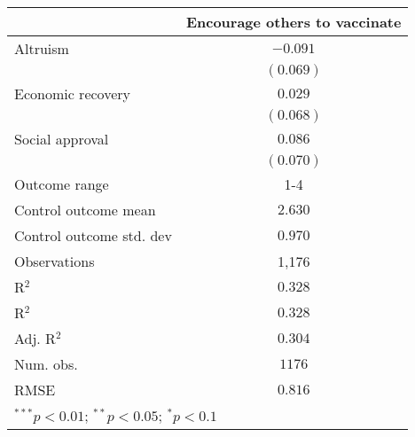 
\begin{table}
\begin{center}
\begin{tabular}{l c}
\hline
 & Encourage others to vaccinate \\
\hline
Altruism                 & $-0.091$  \\
                         & $(0.069)$ \\
Economic recovery        & $0.029$   \\
                         & $(0.068)$ \\
Social approval          & $0.086$   \\
                         & $(0.070)$ \\
\hline
Outcome range            & 1-4       \\
Control outcome mean     & $2.630$   \\
Control outcome std. dev & $0.970$   \\
Observations             & 1,176     \\
R$^{2}$                  & $0.328$   \\
R$^2$                    & $0.328$   \\
Adj. R$^2$               & $0.304$   \\
Num. obs.                & $1176$    \\
RMSE                     & $0.816$   \\
\hline
\multicolumn{2}{l}{\scriptsize{$^{***}p<0.01$; $^{**}p<0.05$; $^{*}p<0.1$}}
\end{tabular}
\caption{}
\label{table:Tables and Figures/SI_table23_motiv_Peru_encourage1-4}
\end{center}
\end{table}
